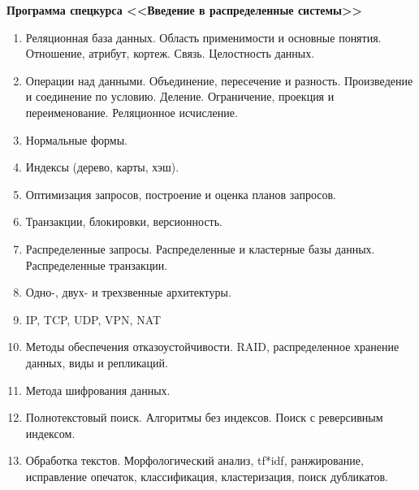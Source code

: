 \documentclass[specialist, subf, href, colorlinks=true, 14pt, times, mtpro, final]{report}
\theoremstyle{definition}
\begin{document}
	\centering
	{\bf Программа спецкурса <<Введение в распределенные системы>>}
	\begin{enumerate}
\item Реляционная база данных. Область применимости и основные понятия. Отношение, атрибут, кортеж. Связь. Целостность данных.
\item Операции над данными. Объединение, пересечение и разность. Произведение и соединение по условию. Деление. Ограничение, проекция и переименование. Реляционное исчисление.
\item Нормальные формы.
\item Индексы (дерево, карты, хэш).
\item Оптимизация запросов, построение и оценка планов запросов.
\item Транзакции, блокировки, версионность.
\item Распределенные запросы. Распределенные и кластерные базы данных. Распределенные транзакции.
\item Одно-, двух- и трехзвенные архитектуры.
\item IP, TCP, UDP, VPN, NAT
\item Методы обеспечения отказоустойчивости. RAID, распределенное хранение данных, виды и репликаций.
\item Метода шифрования данных.
\item Полнотекстовый поиск. Алгоритмы без индексов. Поиск с реверсивным индексом.
\item Обработка текстов. Морфологический анализ, tf*idf, ранжирование, исправление опечаток, классификация, кластеризация, поиск дубликатов.


\end{enumerate}
\end{document}
